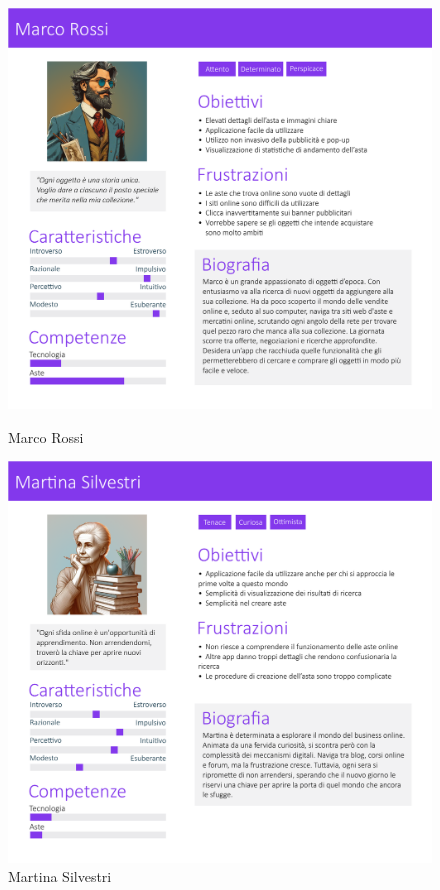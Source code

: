         \begin{figure}[!htb]
           \begin{minipage}{0.48\textwidth}
                \centering
             \includegraphics[width=.7\linewidth]{Immagini/Personas/Marco Rossi.pdf}
             \caption{Marco Rossi}\label{Fig:Marco Rossi}
           \end{minipage}\hfill
           \begin{minipage}{0.48\textwidth}
                \centering
             \includegraphics[width=.7\linewidth]{Immagini/Personas/Martina Silvestri.pdf}
             \caption{Martina Silvestri}\label{Fig:Martina Silvestri}
           \end{minipage}
        \end{figure}

